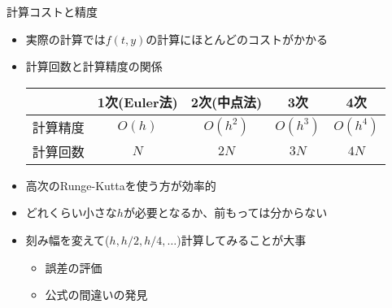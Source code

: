 \begin{frame}[t,fragile]{計算コストと精度}
  \begin{itemize}
    \setlength{\itemsep}{1em}
  \item 実際の計算では$f(t,y)$の計算にほとんどのコストがかかる
  \item 計算回数と計算精度の関係
    \begin{center}
      \begin{tabular}[h]{c|cccc}
        & 1次(Euler法) & 2次(中点法) & 3次 & 4次 \\
        \hline
        計算精度 & $O(h)$ & $O(h^2)$ & $O(h^3)$ & $O(h^4)$ \\
        計算回数 & $N$ & $2N$ & $3N$ & $4N$
      \end{tabular}
    \end{center}
  \item 高次のRunge-Kuttaを使う方が効率的
  \item どれくらい小さな$h$が必要となるか、前もっては分からない
  \item 刻み幅を変えて($h,h/2,h/4,\dots$)計算してみることが大事
    \begin{itemize}
    \item 誤差の評価
    \item 公式の間違いの発見
    \end{itemize}
  \end{itemize}
\end{frame}
